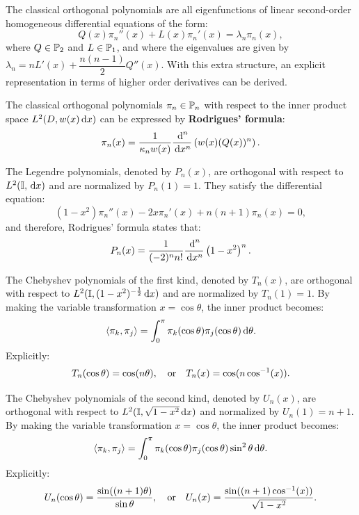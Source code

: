 The classical orthogonal polynomials are all eigenfunctions of linear second-order homogeneous differential equations of the form:
\begin{equation}
Q(x)\pi_n''(x) + L(x)\pi_n'(x) = \lambda_n\pi_n(x),
\end{equation}
where $Q\in\P_2$ and $L\in\P_1$, and where the eigenvalues are given by $\lambda_n = nL'(x) +\dfrac{n(n-1)}{2}Q''(x)$. With this extra structure, an explicit representation in terms of higher order derivatives can be derived.
\begin{theorem}\label{theorem:Rodrigues}
The classical orthogonal polynomials $\pi_n\in\P_n$ with respect to the inner product space $L^2(D,w(x)\ud x)$ can be expressed by {\bf Rodrigues' formula}:
\begin{equation}
\pi_n(x) = \dfrac{1}{\kappa_n w(x)}\dfrac{\ud^n}{\ud x^n}\left(w(x)(Q(x))^n\right).
\end{equation}
\end{theorem}

\begin{example}
The Legendre polynomials, denoted by $P_n(x)$, are orthogonal with respect to $L^2(\I,\ud x)$ and are normalized by $P_n(1)=1$. They satisfy the differential equation:
\begin{equation}
(1-x^2)\pi_n''(x) -2x\pi_n'(x) + n(n+1)\pi_n(x) = 0,
\end{equation}
and therefore, Rodrigues' formula states that:
\begin{equation}
P_n(x) = \dfrac{1}{(-2)^nn!}\dfrac{\ud^n}{\ud x^n}\left(1-x^2\right)^n.
\end{equation}
\end{example}

\begin{example}
The Chebyshev polynomials of the first kind, denoted by $T_n(x)$, are orthogonal with respect to $L^2(\I,(1-x^2)^{-\frac{1}{2}}\ud x)$ and are normalized by $T_n(1)=1$. By making the variable transformation $x=\cos\theta$, the inner product becomes:
\[
\langle \pi_k,\pi_j\rangle = \int_0^\pi \pi_k(\cos\theta)\pi_j(\cos\theta)\ud\theta.
\]
Explicitly:
\begin{equation}\label{eq:Tn}
T_n(\cos\theta) = \cos(n\theta),\quad{\rm or}\quad T_n(x) = \cos(n\cos^{-1}(x)).
\end{equation}
\end{example}

\begin{example}
The Chebyshev polynomials of the second kind, denoted by $U_n(x)$, are orthogonal with respect to $L^2(\I,\sqrt{1-x^2}\ud x)$ and normalized by $U_n(1)=n+1$. By making the variable transformation $x=\cos\theta$, the inner product becomes:
\[
\langle \pi_k,\pi_j\rangle = \int_0^\pi \pi_k(\cos\theta)\pi_j(\cos\theta)\sin^2\theta\ud\theta.
\]
Explicitly:
\begin{equation}
U_n(\cos\theta) = \dfrac{\sin((n+1)\theta)}{\sin\theta},\quad{\rm or}\quad U_n(x) = \dfrac{\sin((n+1)\cos^{-1}(x))}{\sqrt{1-x^2}}.
\end{equation}
\end{example}

